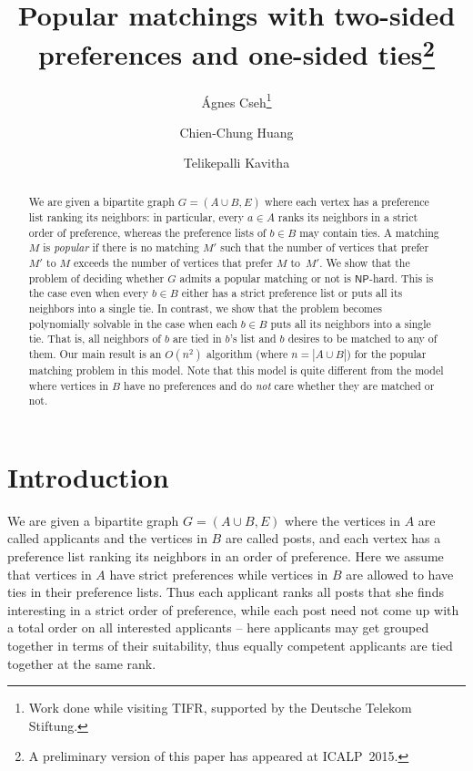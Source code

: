 \documentclass[11pt]{llncs}
\begin{document}
\pagestyle{plain}
\title{Popular matchings with two-sided preferences and one-sided ties\thanks{A preliminary version of this paper has appeared at ICALP~2015.}}
\author{\'{A}gnes Cseh\thanks{Work done while visiting TIFR, supported by the Deutsche Telekom Stiftung.}
\and Chien-Chung Huang\and Telikepalli Kavitha}
\maketitle


\begin{abstract}
We are given a bipartite graph $G = (A \cup B, E)$ where each vertex has a preference list
ranking its neighbors: in particular, every $a \in A$ ranks its neighbors in a strict order 
of preference, whereas the preference lists of $b \in B$ may contain ties. A matching $M$ is 
\emph{popular} if there is no matching $M'$ such that the number of vertices that prefer $M'$ 
to $M$ exceeds the number of vertices that prefer $M$ to~$M'$. We show that the problem of deciding whether 
$G$ admits a popular matching or not is $\mathsf{NP}$-hard. This is the case even when every 
$b \in B$ either has a strict preference list or puts all its neighbors into a single tie. 
In contrast, we show that the problem becomes polynomially solvable in the case when each 
$b \in B$ puts all its neighbors into a single tie. That is, all neighbors of $b$ are tied 
in $b$'s list and $b$ desires to be matched to any of them. Our main result is an $O(n^2)$ algorithm 
(where $n = |A \cup B|$) for the popular matching problem in this model. Note that this model 
is quite different from the model where vertices in $B$ have no preferences and do {\em not} 
care whether they are matched or not.
\end{abstract}

\section{Introduction}
\label{sec:intro}
We are given a bipartite graph $G = (A \cup B, E)$ where the vertices in $A$ are called 
applicants and the vertices in $B$ are called posts, and each vertex has a preference list 
ranking its neighbors in an order of preference. Here we assume that vertices in $A$ have 
strict preferences while vertices in $B$ are allowed to have ties in their preference lists. 
Thus each applicant ranks all posts that she finds interesting in a strict order of preference,
while each post need not come up with a total order on all interested applicants -- here 
applicants may get grouped together in terms of their suitability, thus equally competent 
applicants are tied together at the same rank. 
\end{document}
